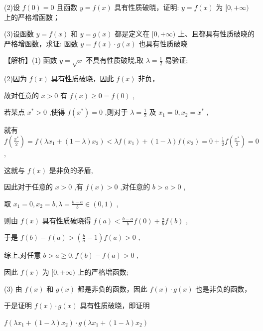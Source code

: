 \documentclass[10pt]{article}
\begin{document}
(2)设 \(f\left( 0\right)  = 0\) 且函数 \(y = f\left( x\right)\) 具有性质破晓，证明: \(y = f\left( x\right)\) 为 \(\lbrack 0, + \infty )\) 上的严格增函数；

(3)设函数 \(y = f\left( x\right)\) 和 \(y = g\left( x\right)\) 都是定义在 \(\lbrack 0, + \infty )\) 上、且都具有性质破晓的严格增函数，求证: 函数 \(y = f\left( x\right)  \cdot  g\left( x\right)\) 也具有性质破晓

【解析】(1) 函数 \(y = \sqrt{x}\) 不具有性质破晓,取 \(\lambda  = \frac{1}{2}\) 易验证;

(2)因为 \(f\left( x\right)\) 具有性质破晓，因此 \(f\left( x\right)\) 非负，

故对任意的 \(x > 0\) 有 \(f\left( x\right)  \geq  0 = f\left( 0\right)\) ,

若某点 \({x}^{ * } > 0\) ,使得 \(f\left( {x}^{ * }\right)  = 0\) ,则对于 \(\lambda  = \frac{1}{2}\) 及 \({x}_{1} = 0,{x}_{2} = {x}^{ * }\) ,

就有 \(f\left( \frac{{x}^{ * }}{2}\right)  = f\left( {\lambda {x}_{1} + \left( {1 - \lambda }\right) {x}_{2}}\right)  < {\lambda f}\left( {x}_{1}\right)  + \left( {1 - \lambda }\right) f\left( {x}_{2}\right)  = 0 + \frac{1}{2}f\left( \frac{{x}^{ * }}{2}\right)  = 0\) ,

这就与 \(f\left( x\right)\) 是非负的矛盾,

因此对于任意的 \(x > 0\) ,有 \(f\left( x\right)  > 0\) ,对任意的 \(b > a > 0\) ,

取 \({x}_{1} = 0,{x}_{2} = b,\lambda  = \frac{b - a}{b} \in  \left( {0,1}\right)\) ,

则由 \(f\left( x\right)\) 具有性质破晓得 \(f\left( a\right)  < \frac{b - a}{b}f\left( 0\right)  + \frac{a}{b}f\left( b\right)\) ,

于是 \(f\left( b\right)  - f\left( a\right)  > \left( {\frac{b}{a} - 1}\right) f\left( a\right)  > 0\) ,

综上,对任意 \(b > a \geq  0,f\left( b\right)  - f\left( a\right)  > 0\) ,

因此 \(f\left( x\right)\) 为 \(\lbrack 0, + \infty )\) 上的严格增函数;

(3) 由 \(f\left( x\right)\) 和 \(g\left( x\right)\) 都是非负的函数，因此 \(f\left( x\right)  \cdot  g\left( x\right)\) 也是非负的函数，

于是证明 \(f\left( x\right)  \cdot  g\left( x\right)\) 具有性质破晓，即证明

\(f\left( {\lambda {x}_{1} + \left( {1 - \lambda }\right) {x}_{2}}\right)  \cdot  g\left( {\lambda {x}_{1} + \left( {1 - \lambda }\right) {x}_{2}}\right)\)
\end{document}
